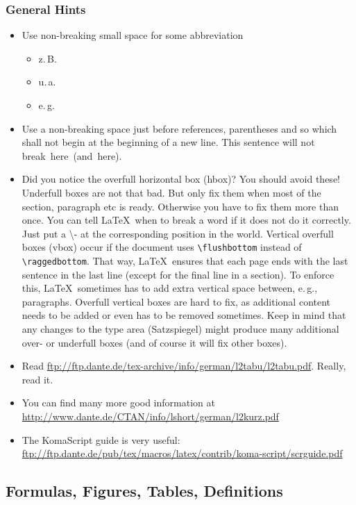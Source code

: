 \subsubsection{General Hints}
\begin{itemize}
 \item Use non-breaking small space for some abbreviation
 \begin{itemize}
 \item z.\,B.
 \item u.\,a.
 \item e.\,g.
 \end{itemize}
 \item Use a non-breaking space just before references, parentheses and so which shall not begin at the beginning of a new line. This sentence will not break~here~(and~here).
 \item Did you notice the overfull horizontal box (hbox)? You should avoid these! Underfull boxes are not that bad. But only fix them when most of the section, paragraph etc is ready. Otherwise you have to fix them more than once. You can tell \LaTeX\ when to break a word if it does not do it correctly. Just put a \textbackslash- at the corresponding position in the world. Vertical overfull boxes (vbox) occur if the document uses \verb|\flushbottom| instead of \verb|\raggedbottom|. That way, \LaTeX\ ensures that each page ends with the last sentence in the last line (except for the final line in a section). To enforce this, \LaTeX\ sometimes has to add extra vertical space between, e.\,g., paragraphs. Overfull vertical boxes are hard to fix, as additional content needs to be added or even has to be removed sometimes. Keep in mind that any changes to the type area (Satzspiegel) might produce many additional over- or underfull boxes (and of course it will fix other boxes).
 \item Read \url{ftp://ftp.dante.de/tex-archive/info/german/l2tabu/l2tabu.pdf}. Really, read it.
 \item You can find many more good information at \url{http://www.dante.de/CTAN/info/lshort/german/l2kurz.pdf}
 \item The KomaScript guide is very useful: \url{ftp://ftp.dante.de/pub/tex/macros/latex/contrib/koma-script/scrguide.pdf}
\end{itemize}


\subsection{Formulas, Figures, Tables, Definitions}

